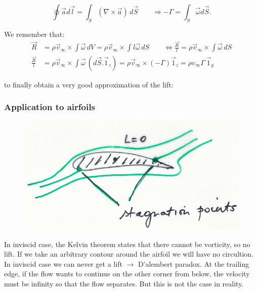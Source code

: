 		\begin{equation}
			\oint \vec{a} d\vec{l} = \int _S (\nabla \times \vec{a})\, d\vec{S} \qquad \Rightarrow -\Gamma = \int _S \vec{\omega} d\vec{S}.
		\end{equation}
		
		We remember that:
		\begin{equation}
		\begin{aligned}
		\vec{R} &= \rho \vec{v}_\infty \times \int  \vec{\omega}\, dV = \rho \vec{v}_\infty \times \int  l\vec{\omega}\, dS \qquad \Leftrightarrow \frac{\vec{R}}{l} = \rho \vec{v}_\infty \times \int  \vec{\omega}\, dS \\
		\frac{\vec{R}}{l}&= \rho \vec{v}_\infty \times \int  \vec{\omega}\, (d\vec{S}.\vec{1}_z) = \rho \vec{v}_\infty \times (-\Gamma)\vec{1}_z = \rho v_\infty \Gamma \,\vec{1}_y
		\end{aligned}
		\end{equation}
		
		to finally obtain a very good approximation of the lift:
		
		\begin{center}
		\end{center}
		
	\subsubsection{Application to airfoils}
		\begin{figure}
		\vspace{-5mm}
		\includegraphics[scale=0.25]{ch1/3}
		\end{figure}
		In inviscid case, the Kelvin theorem states that there cannot be vorticity, so no lift. If we take an arbitrary contour around the airfoil we will have no circultion. In inviscid case we can never get a lift $\rightarrow$ D’alembert paradox. At the trailing edge, if the flow wants to continue on the other corner from below, the velocity must be infinity so that the flow separates. But this is not the case in reality. \\

